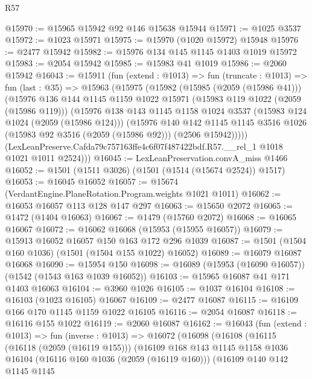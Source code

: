\begin{lexlean}{R57}
\begin{coremodule}
@15970 := @15965 @15942 @92 @146 @15638 @15944
@15971 := @1025 @3537
@15972 := @1023 @15971
@15975 := @15970 (@1020 @15972) @15948
@15976 := @2477 @15942
@15982 := @15976 @134 @145 @1145 @1403 @1019 @15972
@15983 := @2054 @15942
@15985 := @15983 @41 @1019
@15986 := @2060 @15942
@16043 := @15911
    (fun (extend : @1013) =>
    fun (truncate : @1013) =>
    fun (last : @35) =>
    @15963
      (@15975
        (@15982
          (@15985 (@2059 (@15986 @41)))
          (@15976
            @136
            @144
            @1145
            @1159
            @1022
            @15971
            (@15983 @119 @1022 (@2059 (@15986 @119)))
            (@15976
              @138
              @143
              @1145
              @1158
              @1024
              @3537
              (@15983 @124 @1024 (@2059 (@15986 @124)))
              (@15976
                @140
                @142
                @1145
                @1145
                @3516
                @1026
                (@15983 @92 @3516 (@2059 (@15986 @92)))
                (@2506 @15942)))))
        (LexLeanPreserve.Cafda79c757163ffe4c6f07f487422bdf.R57.__rel_1 @1018 @1021 @1011 @2524)))
@16045 := LexLeanPreservation.convA_miss @1466
@16052 := @1501 (@1511 @3026) (@1501 (@1514 (@15674 @2524)) @1517)
@16053 := @16045 @16052
@16057 := @15674 (VerdantEngine.PlaneRotation.Program.weights @1021 @1011)
@16062 := @16053 @16057 @113 @128 @147 @297
@16063 := @15650 @2072
@16065 := @1472 (@1404 @16063)
@16067 := @1479 (@15760 @2072)
@16068 := @16065 @16067
@16072 := @16062 @16068 (@15953 (@15955 @16057))
@16079 := @15913 @16052 @16057 @150 @163 @172 @296 @1039
@16087 := @1501 (@1504 @160 @1036) (@1501 (@1504 @155 @1022) @16052)
@16089 := @16079 @16087 @16068
@16090 := @15954 @150
@16098 := @16089 (@15953 (@16090 @16057)) (@1542 (@1543 @163 @1039 @16052))
@16103 := @15965 @16087 @41 @171 @1403 @16063
@16104 := @3960 @1026
@16105 := @1037 @16104
@16108 := @16103 (@1023 @16105) @16067
@16109 := @2477 @16087
@16115 := @16109 @166 @170 @1145 @1159 @1022 @16105
@16116 := @2054 @16087
@16118 := @16116 @155 @1022
@16119 := @2060 @16087
@16162 := @16043
    (fun (extend : @1013) =>
    fun (inverse : @1013) =>
    @16072
      (@16098
        (@16108
          (@16115
            (@16118 (@2059 (@16119 @155)))
            (@16109
              @168
              @143
              @1145
              @1158
              @1036
              @16104
              (@16116 @160 @1036 (@2059 (@16119 @160)))
              (@16109
                @140
                @142
                @1145
                @1145

\end{coremodule}
\end{lexlean}
